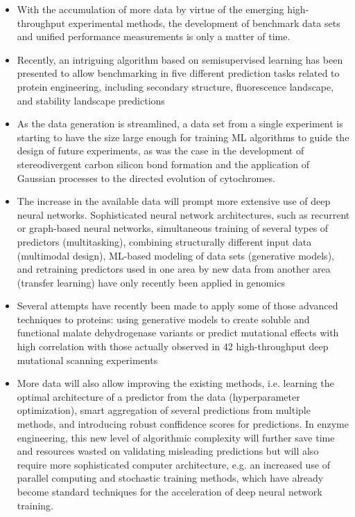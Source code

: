 \documentclass[12pt]{article}
\begin{document}
\begin{itemize}
\item With the accumulation of more data by virtue of the emerging high-throughput experimental methods, the development of benchmark data sets and unified performance measurements is only a matter of time.

\item Recently, an intriguing algorithm based on semisupervised learning has been presented to allow benchmarking in five different prediction tasks related to protein engineering, including secondary structure, fluorescence landscape, and stability landscape predictions \cite{88}

\item As the data generation is streamlined, a data set from a single experiment is starting to have the size large enough for training ML algorithms to guide the design of future experiments, as was the case in the development of stereodivergent carbon silicon bond formation\cite{71} and the application of Gaussian processes to the directed evolution of cytochromes\cite{89}.

\item The increase in the available data will prompt more extensive use of deep neural networks. Sophisticated neural network architectures, such as recurrent or graph-based neural networks, simultaneous training of several types of predictors (multitasking), combining structurally different input data (multimodal design), ML-based modeling of data sets (generative models), and retraining predictors used in one area by new data from another area (transfer learning) have only recently been applied in genomics\cite{14}


\item Several attempts have recently been made to apply some of those advanced techniques to proteins: using generative models to create soluble and functional malate dehydrogenase variants\cite{90} or predict mutational effects with high correlation with those actually observed in 42 high-throughput deep mutational scanning experiments\cite{91}


\item More data will also allow improving the existing methods, i.e. learning the optimal architecture of a predictor from the data (hyperparameter optimization)\cite{92}, smart aggregation of several predictions from multiple methods\cite{93}, and introducing robust conffidence scores for predictions\cite{94}. In enzyme engineering, this new level of algorithmic complexity will further save time and resources wasted on validating misleading predictions but will also require more sophisticated computer architecture, e.g. an increased use of parallel computing and stochastic training methods, which have already become standard techniques for the acceleration of deep neural network training.




\end{itemize}
\end{document}
